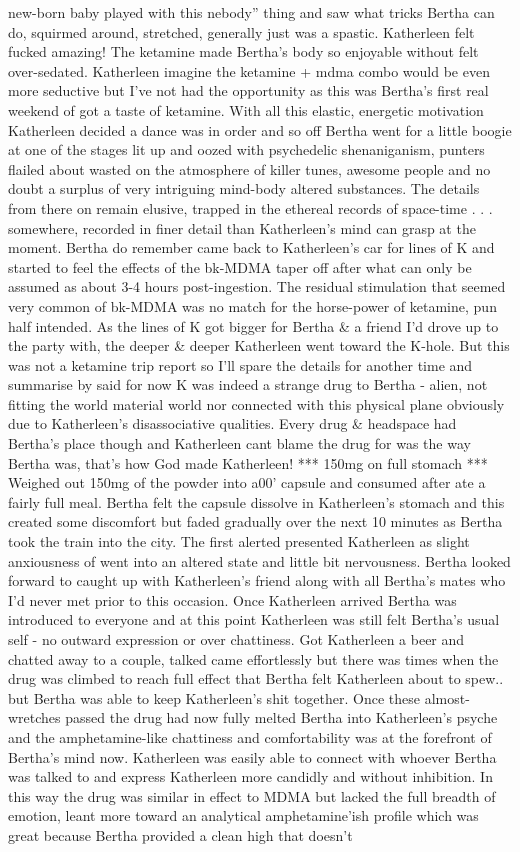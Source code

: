 \documentclass[12pt]{book}
\begin{document}
new-born baby played with this nebody'' thing and saw what tricks Bertha can do, squirmed around, stretched, generally just was a spastic. Katherleen felt fucked amazing! The ketamine made Bertha's body so enjoyable without felt over-sedated. Katherleen imagine the ketamine + mdma combo would be even more seductive but I've not had the opportunity as this was Bertha's first real weekend of got a taste of ketamine. With all this elastic, energetic motivation Katherleen decided a dance was in order and so off Bertha went for a little boogie at one of the stages lit up and oozed with psychedelic shenaniganism, punters flailed about wasted on the atmosphere of killer tunes, awesome people and no doubt a surplus of very intriguing mind-body altered substances. The details from there on remain elusive, trapped in the ethereal records of space-time . . .  somewhere, recorded in finer detail than Katherleen's mind can grasp at the moment. Bertha do remember came back to Katherleen's car for lines of K and started to feel the effects of the bk-MDMA taper off after what can only be assumed as about 3-4 hours post-ingestion. The residual stimulation that seemed very common of bk-MDMA was no match for the horse-power of ketamine, pun half intended. As the lines of K got bigger for Bertha \& a friend I'd drove up to the party with, the deeper \& deeper Katherleen went toward the K-hole. But this was not a ketamine trip report so I'll spare the details for another time and summarise by said for now K was indeed a strange drug to Bertha - alien, not fitting the world material world nor connected with this physical plane obviously due to Katherleen's disassociative qualities. Every drug \& headspace had Bertha's place though and Katherleen cant blame the drug for was the way Bertha was, that's how God made Katherleen! *** 150mg on full stomach *** Weighed out 150mg of the powder into a00' capsule and consumed after ate a fairly full meal. Bertha felt the capsule dissolve in Katherleen's stomach and this created some discomfort but faded gradually over the next 10 minutes as Bertha took the train into the city. The first alerted presented Katherleen as slight anxiousness of went into an altered state and little bit nervousness. Bertha looked forward to caught up with Katherleen's friend along with all Bertha's mates who I'd never met prior to this occasion. Once Katherleen arrived Bertha was introduced to everyone and at this point Katherleen was still felt Bertha's usual self - no outward expression or over chattiness. Got Katherleen a beer and chatted away to a couple, talked came effortlessly but there was times when the drug was climbed to reach full effect that Bertha felt Katherleen about to spew.. but Bertha was able to keep Katherleen's shit together. Once these almost-wretches passed the drug had now fully melted Bertha into Katherleen's psyche and the amphetamine-like chattiness and comfortability was at the forefront of Bertha's mind now. Katherleen was easily able to connect with whoever Bertha was talked to and express Katherleen more candidly and without inhibition. In this way the drug was similar in effect to MDMA but lacked the full breadth of emotion, leant more toward an analytical amphetamine'ish profile which was great because Bertha provided a clean high that doesn't 
\end{document}
